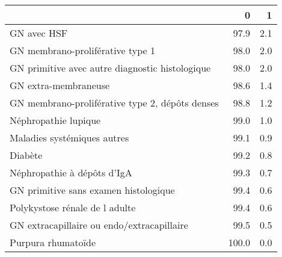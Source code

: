 \documentclass[11pt,a4paper]{article}\usepackage[]{graphicx}\usepackage[]{color}
\begin{document}
\begin{table}[H]
\centering
\begin{tabular}{lrr}
  \hline
 & 0 & 1 \\ 
  \hline
GN avec HSF & 97.9 & 2.1 \\ 
  GN membrano-proliférative type 1 & 98.0 & 2.0 \\ 
  GN primitive avec autre diagnostic histologique & 98.0 & 2.0 \\ 
  GN extra-membraneuse & 98.6 & 1.4 \\ 
  GN membrano-proliférative type 2, dépôts denses & 98.8 & 1.2 \\ 
  Néphropathie lupique & 99.0 & 1.0 \\ 
  Maladies systémiques autres & 99.1 & 0.9 \\ 
  Diabète & 99.2 & 0.8 \\ 
  Néphropathie à dépôts d'IgA & 99.3 & 0.7 \\ 
  GN primitive sans examen histologique & 99.4 & 0.6 \\ 
  Polykystose rénale de l adulte & 99.4 & 0.6 \\ 
  GN extracapillaire ou endo/extracapillaire & 99.5 & 0.5 \\ 
  Purpura rhumatoïde & 100.0 & 0.0 \\ 
   \hline
\end{tabular}
\end{table}

~\\
\end{document}
